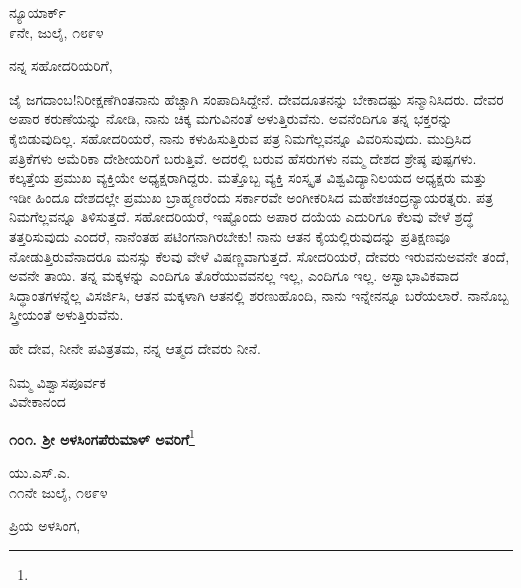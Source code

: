 \begin{flushright}
ನ್ಯೂಯಾರ್ಕ್\\೯ನೇ, ಜುಲೈ, ೧೮೯೪
\end{flushright}

\noindent
ನನ್ನ ಸಹೋದರಿಯರಿಗೆ,

ಜೈ ಜಗದಾಂಬ!ನಿರೀಕ್ಷಣೆಗಿಂತನಾನು ಹೆಚ್ಚಾಗಿ ಸಂಪಾದಿಸಿದ್ದೇನೆ. ದೇವದೂತನನ್ನು ಬೇಕಾದಷ್ಟು ಸನ್ಮಾನಿಸಿದರು. ದೇವರ ಅಪಾರ ಕರುಣೆಯನ್ನು ನೋಡಿ, ನಾನು ಚಿಕ್ಕ ಮಗುವಿನಂತೆ ಅಳುತ್ತಿರುವೆನು. ಅವನೆಂದಿಗೂ ತನ್ನ ಭಕ್ತರನ್ನು ಕೈಬಿಡುವುದಿಲ್ಲ. ಸಹೋದರಿಯರೆ, ನಾನು ಕಳುಹಿಸುತ್ತಿರುವ ಪತ್ರ ನಿಮಗೆಲ್ಲವನ್ನೂ ವಿವರಿಸುವುದು. ಮುದ್ರಿಸಿದ ಪತ್ರಿಕೆಗಳು ಅಮೆರಿಕಾ ದೇಶೀಯರಿಗೆ ಬರುತ್ತಿವೆ. ಅದರಲ್ಲಿ ಬರುವ ಹೆಸರುಗಳು ನಮ್ಮ ದೇಶದ ಶ್ರೇಷ್ಠ ಪುಷ್ಪಗಳು. ಕಲ್ಕತ್ತೆಯ ಪ್ರಮುಖ ವ್ಯಕ್ತಿಯೇ ಅಧ್ಯಕ್ಷರಾಗಿದ್ದರು. ಮತ್ತೊಬ್ಬ ವ್ಯಕ್ತಿ ಸಂಸ್ಕೃತ ವಿಶ್ವವಿದ್ಯಾನಿಲಯದ ಅಧ್ಯಕ್ಷರು ಮತ್ತು ಇಡೀ ಹಿಂದೂ ದೇಶದಲ್ಲೇ ಪ್ರಮುಖ ಬ್ರಾಹ್ಮಣರೆಂದು ಸರ್ಕಾರವೇ ಅಂಗೀಕರಿಸಿದ ಮಹೇಶಚಂದ್ರನ್ಯಾಯರತ್ನರು. ಪತ್ರ ನಿಮಗೆಲ್ಲವನ್ನೂ ತಿಳಿಸುತ್ತದೆ. ಸಹೋದರಿಯರೆ, ಇಷ್ಟೊಂದು ಅಪಾರ ದಯೆಯ ಎದುರಿಗೂ ಕೆಲವು ವೇಳೆ ಶ್ರದ್ಧೆ ತತ್ತರಿಸುವುದು ಎಂದರೆ, ನಾನೆಂತಹ ಪಟಿಂಗನಾಗಿರಬೇಕು! ನಾನು ಆತನ ಕೈಯಲ್ಲಿರುವುದನ್ನು ಪ್ರತಿಕ್ಷಣವೂ ನೋಡುತ್ತಿರುವೆನಾದರೂ ಮನಸ್ಸು ಕೆಲವು ವೇಳೆ ವಿಷಣ್ಣವಾಗುತ್ತದೆ. ಸೋದರಿಯರೆ, ದೇವರು ಇರುವನು\enginline{-}ಅವನೇ ತಂದೆ, ಅವನೇ ತಾಯಿ. ತನ್ನ ಮಕ್ಕಳನ್ನು ಎಂದಿಗೂ ತೊರೆಯುವವನಲ್ಲ \enginline{-}ಇಲ್ಲ, ಎಂದಿಗೂ ಇಲ್ಲ. ಅಸ್ವಾಭಾವಿಕವಾದ ಸಿದ್ಧಾಂತಗಳನ್ನೆಲ್ಲ ವಿಸರ್ಜಿಸಿ, ಆತನ ಮಕ್ಕಳಾಗಿ ಆತನಲ್ಲಿ ಶರಣುಹೊಂದಿ, ನಾನು ಇನ್ನೇನನ್ನೂ ಬರೆಯಲಾರೆ. ನಾನೊಬ್ಬ ಸ್ತ್ರೀಯಂತೆ ಅಳುತ್ತಿರುವೆನು.

\eject

ಹೇ ದೇವ, ನೀನೇ ಪವಿತ್ರತಮ, ನನ್ನ ಆತ್ಮದ ದೇವರು ನೀನೆ.

\vspace{-0.5cm}

{\flushright
ನಿಮ್ಮ ವಿಶ್ವಾಸಪೂರ್ವಕ\\ವಿವೇಕಾನಂದ\par}

\begin{center}
\textbf{೧೦೧. ಶ‍್ರೀ ಅಳಸಿಂಗಪೆರುಮಾಳ್ ಅವರಿಗೆ}\footnote{}
\end{center}

\vspace{-0.5cm}

\begin{flushright}
ಯು.ಎಸ್.ಎ.\\೧೧ನೇ ಜುಲೈ, ೧೮೯೪
\end{flushright}

\vspace{-0.5cm}

\noindent
ಪ್ರಿಯ ಅಳಸಿಂಗ,

